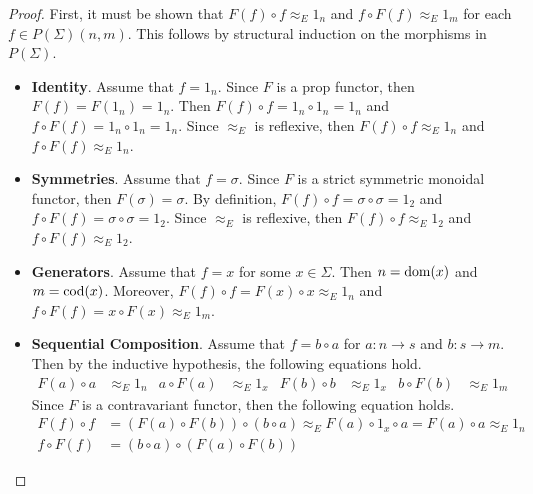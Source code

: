 \begin{proof}
    First, it must be shown that $F( f ) \circ f \approx_E 1_n$ and $f \circ F( f ) \approx_E 1_m$ for each $f \in P( \Sigma )( n, m )$.
    This follows by structural induction on the morphisms in $P( \Sigma )$.
    \begin{itemize}
    \item \textbf{Identity}.
          Assume that $f = 1_n$.
          Since $F$ is a prop functor, then $F( f ) = F( 1_n ) = 1_n$.
          Then $F( f ) \circ f = 1_n \circ 1_n = 1_n$ and $f \circ F( f ) = 1_n \circ 1_n = 1_n$.
          Since $\approx_E$ is reflexive, then $F( f ) \circ f \approx_E 1_n$ and $f \circ F( f ) \approx_E 1_n$.
    \item \textbf{Symmetries}.
          Assume that $f = \sigma$.
          Since $F$ is a strict symmetric monoidal functor, then $F( \sigma ) = \sigma$.
          By definition, $F( f ) \circ f = \sigma \circ \sigma = 1_2$ and $f \circ F( f ) = \sigma \circ \sigma = 1_2$.
          Since $\approx_E$ is reflexive, then $F( f ) \circ f \approx_E 1_2$ and $f \circ F( f ) \approx_E 1_2$.
    \item \textbf{Generators}.
          Assume that $f = x$ for some $x \in \Sigma$.
          Then $n = \operatorname{dom}( x )$ and $m = \operatorname{cod}( x )$.
          Moreover, $F( f ) \circ f = F( x ) \circ x \approx_E 1_n$ and $f \circ F( f ) = x \circ F( x ) \approx_E 1_m$.
    \item \textbf{Sequential Composition}.
          Assume that $f = b \circ a$ for $a: n \to s$ and $b: s \to m$.
          Then by the inductive hypothesis, the following equations hold.
          \begin{align*}
                F( a ) \circ a &\approx_E 1_n
                &
                a \circ F( a ) &\approx_E 1_x
                &
                F( b ) \circ b &\approx_E 1_x
                &
                b \circ F( b ) &\approx_E 1_m
          \end{align*}
          Since $F$ is a contravariant functor, then the following equation holds.
          \begin{align*}
              F( f ) \circ f
                &=
                ( F( a ) \circ F( b ) ) \circ ( b \circ a )
                \approx_E
                F( a ) \circ 1_x \circ a
                =
                F( a ) \circ a
                \approx_E
                1_n
              \\
              f \circ F( f )
                &=
                ( b \circ a ) \circ ( F( a ) \circ F( b ) )

\end{align*}
\end{itemize}
\end{proof}
